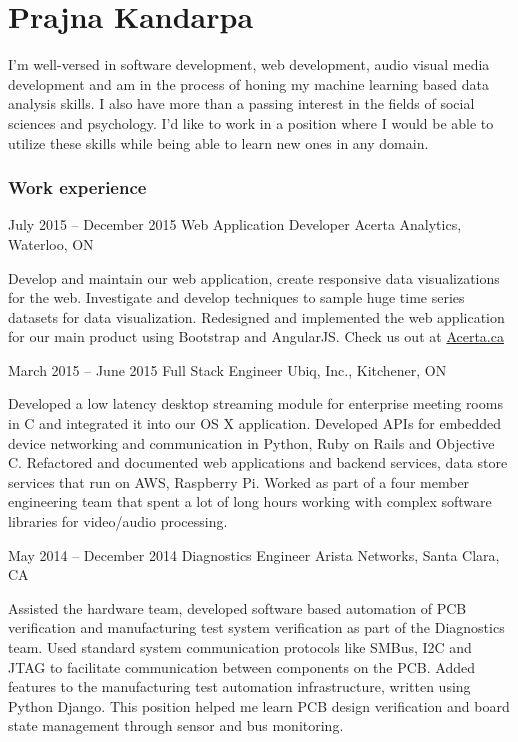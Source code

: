 \documentclass{tccv}
\begin{document}
\part{Prajna Kandarpa}
I'm well-versed in software development, web development, audio visual media development and am in the process of honing my machine learning based data analysis skills. I also have more than a passing interest in the fields of social sciences and psychology. I'd like to work in a position where I would be able to utilize these skills while being able to learn new ones in any domain. 
\section{Work experience}

\begin{eventlist}

\item{July 2015 -- December 2015}
    {Web Application Developer}
    {Acerta Analytics, Waterloo, ON}

Develop and maintain our web application, create responsive data visualizations for the web. Investigate and develop techniques to sample huge time series datasets for data visualization. Redesigned and implemented the web application for our main product using Bootstrap and AngularJS. Check us out at \href{http://www.acerta.ca}{Acerta.ca}

\item{March 2015 -- June 2015}
     {Full Stack Engineer}
     {Ubiq, Inc., Kitchener, ON}

Developed a low latency desktop streaming module for enterprise meeting rooms in C and integrated it into our OS X application. Developed APIs for embedded device networking and communication in Python, Ruby on Rails and Objective C. Refactored and documented web applications and backend services, data store services that run on AWS, Raspberry Pi. Worked as part of a four member engineering team that spent a lot of long hours working with complex software libraries for video/audio processing.

\item{May 2014 -- December 2014}
     {Diagnostics Engineer}
     {Arista Networks, Santa Clara, CA}

Assisted the hardware team, developed software based automation of PCB verification and manufacturing test system verification as part of the Diagnostics team. Used standard system communication protocols like SMBus, I2C and JTAG to facilitate communication between components on the PCB. Added features to the manufacturing test automation infrastructure, written using Python Django. This position helped me learn PCB design verification and board state management through sensor and bus monitoring.


\end{eventlist}
\end{document}
